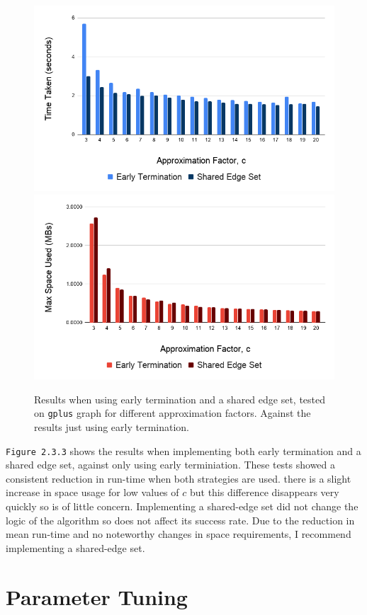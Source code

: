 \documentclass[11pt,twoside,a4paper]{report}
\begin{document}
\begin{figure}[H]
	\label{Figure 4}
	\includegraphics[width=.5\textwidth]{img/gplusSharedEdgeSetTime.png}
	\includegraphics[width=.5\textwidth]{img/gplusSharedEdgeSetSpace.png}
	\caption{Results when using early termination and a shared edge set, tested on \texttt{gplus} graph for different approximation factors. Against the results just using early termination.}
\end{figure}

\par \texttt{Figure 2.3.3} shows the results when implementing both early termination and a shared edge set, against only using early terminiation. These tests showed a consistent reduction in run-time when both strategies are used. there is a slight increase in space usage for low values of $c$ but this difference disappears very quickly so is of little concern. Implementing a shared-edge set did not change the logic of the algorithm so does not affect its success rate. Due to the reduction in mean run-time and no noteworthy changes in space requirements, I recommend implementing a shared-edge set.

\section{Parameter Tuning}

\end{document}
